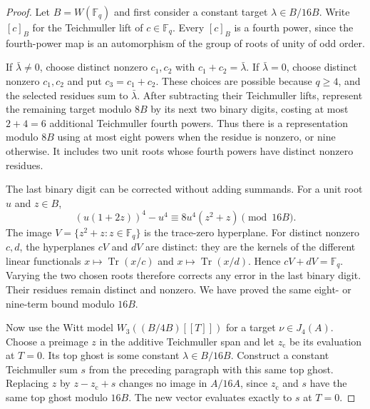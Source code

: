 \documentclass[11pt]{amsart}
\theoremstyle{definition}
\numberwithin{equation}{section}
\begin{document}
\begin{proof}
Let $B=W(\mathbb F_q)$ and first consider a constant target
$\lambda\in B/16B$. Write $[c]_B$ for the Teichmuller lift of
$c\in\mathbb F_q$. Every $[c]_B$ is a fourth power, since the fourth-power
map is an automorphism of the group of roots of unity of odd order.

If $\bar\lambda\ne0$, choose distinct nonzero $c_1,c_2$ with
$c_1+c_2=\bar\lambda$. If $\bar\lambda=0$, choose distinct nonzero
$c_1,c_2$ and put $c_3=c_1+c_2$. These choices are possible because
$q\ge4$, and the selected residues sum to $\bar\lambda$.
After subtracting their Teichmuller lifts, represent the remaining
target modulo $8B$ by its next two binary digits, costing at most
$2+4=6$ additional Teichmuller fourth powers. Thus there is a
representation modulo $8B$ using at most eight powers when the residue
is nonzero, or nine otherwise. It includes two unit roots whose fourth
powers have distinct nonzero residues.

The last binary digit can be corrected without adding summands. For a
unit root $u$ and $z\in B$,
\[
 (u(1+2z))^4-u^4\equiv8u^4(z^2+z)\pmod{16B}.
\]
The image $V=\{z^2+z:z\in\mathbb F_q\}$ is the trace-zero hyperplane.
For distinct nonzero $c,d$, the hyperplanes $cV$ and $dV$ are distinct:
they are the kernels of the different linear functionals
$x\mapsto\operatorname{Tr}(x/c)$ and
$x\mapsto\operatorname{Tr}(x/d)$. Hence $cV+dV=\mathbb F_q$.
Varying the two chosen roots therefore corrects any error in the last
binary digit. Their residues remain distinct and nonzero. We have
proved the same eight- or nine-term bound modulo $16B$.

Now use the Witt model $W_3((B/4B)[[T]])$ for a target
$\nu\in J_4(A)$. Choose a preimage $z$ in the additive Teichmuller span
and let $z_{\mathrm c}$ be its evaluation at $T=0$. Its top ghost is some constant
$\lambda\in B/16B$. Construct a constant Teichmuller sum $s$ from the
preceding paragraph with this same top ghost. Replacing $z$ by
$z-z_{\mathrm c}+s$ changes no image in $A/16A$, since
$z_{\mathrm c}$ and $s$ have the same top ghost modulo $16B$.
The new vector evaluates exactly to $s$ at $T=0$.


\end{proof}
\end{document}
